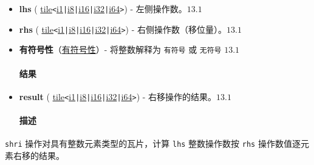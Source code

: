 \documentclass{article}
\begin{document}
\begin{itemize}
\item \textbf{lhs} ( \href{https://docs.nvidia.com/cuda/tile-ir/latest/sections/types.html#type-tile}{tile}\texttt{<}\href{https://docs.nvidia.com/cuda/tile-ir/latest/sections/types.html#subsection-element-types}{i1}\texttt{|}\href{https://docs.nvidia.com/cuda/tile-ir/latest/sections/types.html#subsection-element-types}{i8}\texttt{|}\href{https://docs.nvidia.com/cuda/tile-ir/latest/sections/types.html#subsection-element-types}{i16}\texttt{|}\href{https://docs.nvidia.com/cuda/tile-ir/latest/sections/types.html#subsection-element-types}{i32}\texttt{|}\href{https://docs.nvidia.com/cuda/tile-ir/latest/sections/types.html#subsection-element-types}{i64}\texttt{>}) - 左侧操作数。$\boxed{13.1}$
\item \textbf{rhs} ( \href{https://docs.nvidia.com/cuda/tile-ir/latest/sections/types.html#type-tile}{tile}\texttt{<}\href{https://docs.nvidia.com/cuda/tile-ir/latest/sections/types.html#subsection-element-types}{i1}\texttt{|}\href{https://docs.nvidia.com/cuda/tile-ir/latest/sections/types.html#subsection-element-types}{i8}\texttt{|}\href{https://docs.nvidia.com/cuda/tile-ir/latest/sections/types.html#subsection-element-types}{i16}\texttt{|}\href{https://docs.nvidia.com/cuda/tile-ir/latest/sections/types.html#subsection-element-types}{i32}\texttt{|}\href{https://docs.nvidia.com/cuda/tile-ir/latest/sections/types.html#subsection-element-types}{i64}\texttt{>}) - 右侧操作数（移位量）。$\boxed{13.1}$
\item \textbf{有符号性}（\href{https://docs.nvidia.com/cuda/tile-ir/latest/sections/operations.html#op-attribute-cuda-tile-shri-signedness-attr}{有符号性}）- 将整数解释为 \texttt{有符号} 或 \texttt{无符号} $\boxed{13.1}$




\paragraph{结果}


\item \textbf{result} ( \href{https://docs.nvidia.com/cuda/tile-ir/latest/sections/types.html#type-tile}{tile}\texttt{<}\href{https://docs.nvidia.com/cuda/tile-ir/latest/sections/types.html#subsection-element-types}{i1}\texttt{|}\href{https://docs.nvidia.com/cuda/tile-ir/latest/sections/types.html#subsection-element-types}{i8}\texttt{|}\href{https://docs.nvidia.com/cuda/tile-ir/latest/sections/types.html#subsection-element-types}{i16}\texttt{|}\href{https://docs.nvidia.com/cuda/tile-ir/latest/sections/types.html#subsection-element-types}{i32}\texttt{|}\href{https://docs.nvidia.com/cuda/tile-ir/latest/sections/types.html#subsection-element-types}{i64}\texttt{>}) - 右移操作的结果。$\boxed{13.1}$




\paragraph{描述}


\end{itemize}
\texttt{shri} 操作对具有整数元素类型的瓦片，计算 \texttt{lhs} 整数操作数按 \texttt{rhs} 操作数值逐元素右移的结果。
\end{document}
